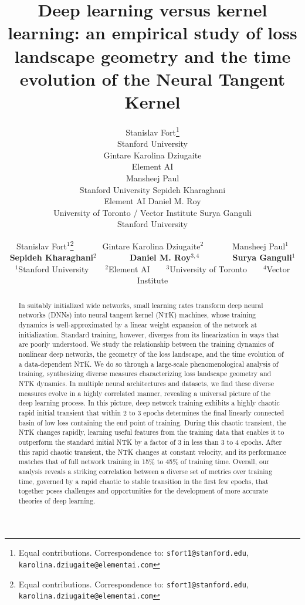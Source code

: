 \documentclass{article}
\title{Deep learning versus kernel learning: an empirical study of loss landscape geometry and the time evolution of the Neural Tangent Kernel}
\author{%
  Stanislav Fort\thanks{Equal contributions. Correspondence to: \texttt{sfort1@stanford.edu}, \texttt{karolina.dziugaite@elementai.com} }\\
  Stanford University\\
  \And
  Gintare Karolina Dziugaite\samethanks{}\\
  Element AI\\
%
  \And
  Mansheej Paul\\
  Stanford University%
  \And
  Sepideh Kharaghani\\
  Element AI%
  \And
  Daniel M. Roy\\
  University of Toronto / Vector Institute%
  \And
  Surya Ganguli\\
  Stanford University%
}
\author{Stanislav Fort$^1$\thanks{Equal contributions. Correspondence to: \texttt{sfort1@stanford.edu}, \texttt{karolina.dziugaite@elementai.com} }\ \ \ \ \ \ \     Gintare Karolina Dziugaite$^2$\samethanks{}\  \ \ \ \ \ \   Mansheej Paul$^1$ \\ \textbf{Sepideh Kharaghani$^2$\ \ \ \ \ \ \  Daniel M. Roy$^{3,4}$\ \ \ \ \ \ \  Surya Ganguli$^1$}\\
$^1$Stanford University\ \ \ \  $^2$Element AI\ \ \ \  $^3$University of Toronto\ \ \ \  $^4$Vector Institute  }
\begin{document}
\maketitle

\begin{abstract}

%

In suitably initialized wide networks, small learning rates transform deep neural networks (DNNs) into neural tangent kernel (NTK) machines, whose training dynamics is well-approximated by a linear weight expansion of the network at initialization. 
Standard training, however, diverges from its linearization in ways that are poorly understood. 
We study the relationship between the training dynamics of nonlinear deep networks, the geometry of the loss landscape, and the time evolution of a data-dependent NTK. 
We do so through a large-scale phenomenological analysis of training, synthesizing diverse measures characterizing loss landscape geometry and NTK dynamics. 
In multiple neural architectures and datasets, we find these diverse measures evolve in a highly correlated manner, revealing a universal picture of the deep learning process. 
In this picture, deep network training exhibits a highly chaotic rapid initial transient that within 2 to 3 epochs determines the final linearly connected basin of low loss containing the end point of training.  
During this chaotic transient, the NTK changes rapidly, learning useful features from the training data that enables it to outperform the standard initial NTK by a factor of 3 in less than 3 to 4 epochs.  
After this rapid chaotic transient, the NTK changes at constant velocity, and its performance matches that of full network training in 15\% to 45\% of training time.   
Overall, our analysis reveals a striking correlation between a diverse set of metrics over training time, governed by a rapid chaotic to stable transition in the first few epochs, that together poses challenges and opportunities for the development of more accurate theories of deep learning. 

 
\end{abstract}
\end{document}

